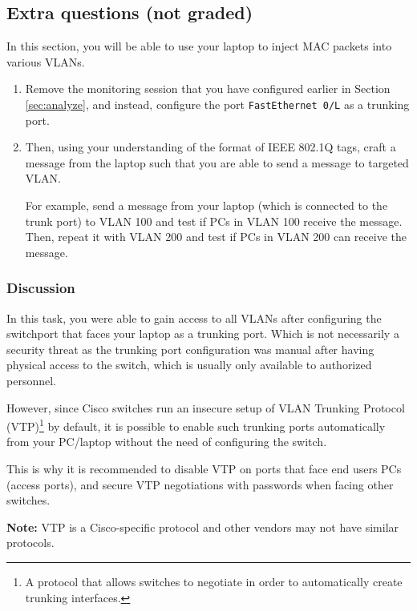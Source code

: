 \documentclass[pdftex,12pt,a4paper]{article}
\begin{document}
        \subsection{Extra questions (not graded)}

            In this section, you will be able to use your laptop to inject MAC
            packets into various VLANs.

            \begin{enumerate}
                \item Remove the monitoring session that you have configured
                    earlier in Section \ref{sec:analyze}, and instead,
                    configure the port \texttt{FastEthernet 0/L} as a trunking
                    port.

                \item Then, using your understanding of the format of IEEE
                    802.1Q tags, craft a message from the laptop such that you
                    are able to send a message to targeted VLAN.

                    For example, send a message from your laptop (which is connected to
                    the trunk port) to VLAN 100 and test if PCs in VLAN 100 receive the
                    message. Then, repeat it with VLAN 200 and test if PCs in VLAN 200
                    can receive the message.
            \end{enumerate}

            \subsubsection{Discussion}
                In this task, you were able to gain access to all VLANs after
                configuring the switchport that faces your laptop as a trunking
                port. Which is not necessarily a security threat as the trunking port
                configuration was manual after having physical access to the
                switch, which is usually only available to authorized personnel.

                However, since Cisco switches run an insecure setup of VLAN
                Trunking Protocol (VTP)\footnote{A protocol that allows
                switches to negotiate in order to automatically create
                trunking interfaces.} by default, it is possible to enable such
                trunking ports automatically from your PC/laptop without the
                need of configuring the switch.

                This is why it is recommended to disable VTP on ports that face end
                users PCs (access ports), and secure VTP negotiations with
                passwords when facing other switches.

                \textbf{Note:} VTP is a Cisco-specific protocol and other vendors
                may not have similar protocols.
\end{document}

